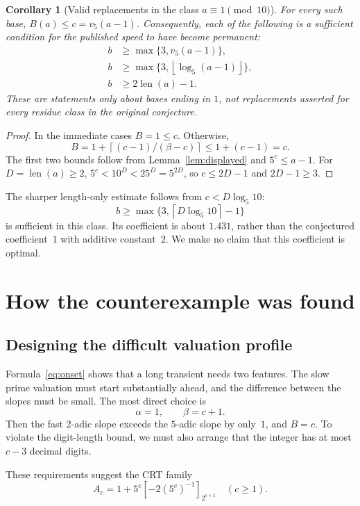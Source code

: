 \documentclass[11pt,a4paper]{article}
\newtheorem{corollary}[theorem]{Corollary}
\theoremstyle{definition}
\theoremstyle{remark}
\newcommand{\len}{\operatorname{len}}
\newcommand{\ceil}[1]{\left\lceil #1\right\rceil}
\newcommand{\floor}[1]{\left\lfloor #1\right\rfloor}
\newcommand{\res}[2]{\left[#1\right]_{#2}}
\begin{document}
\begin{corollary}[Valid replacements in the class $a\equiv1\pmod{10}$]\label{cor:replacement}
For every such base, $B(a)\le c=v_5(a-1)$. Consequently, each of the following is a sufficient condition for the published speed to have become permanent:
\begin{align}
 b&\ge\max\{3,v_5(a-1)\},\label{eq:valbound}\\
 b&\ge\max\{3,\floor{\log_5(a-1)}\},\label{eq:logbound}\\
 b&\ge2\len(a)-1.\label{eq:coarsebound}
\end{align}
These are statements only about bases ending in $1$, not replacements asserted for every residue class in the original conjecture.
\end{corollary}
\begin{proof}
In the immediate cases $B=1\le c$. Otherwise,
\[
 B=1+\ceil{(c-1)/(\beta-c)}\le1+(c-1)=c.
\]
The first two bounds follow from Lemma~\ref{lem:displayed} and $5^c\le a-1$.
For $D=\len(a)\ge2$, $5^c<10^D<25^D=5^{2D}$, so $c\le2D-1$ and $2D-1\ge3$.
\end{proof}

The sharper length-only estimate follows from $c<D\log_5 10$:
\[
 b\ge\max\{3,\ceil{D\log_5 10}-1\}
\]
is sufficient in this class. Its coefficient is about $1.431$, rather than the conjectured coefficient~$1$ with additive constant~$2$. We make no claim that this coefficient is optimal.

\section{How the counterexample was found}
\label{sec:search}

\subsection{Designing the difficult valuation profile}
Formula~\eqref{eq:onset} shows that a long transient needs two features. The slow prime valuation must start substantially ahead, and the difference between the slopes must be small. The most direct choice is
\[
 \alpha=1,\qquad\beta=c+1.
\]
Then the fast $2$-adic slope exceeds the $5$-adic slope by only~$1$, and $B=c$. To violate the digit-length bound, we must also arrange that the integer has at most $c-3$ decimal digits.

These requirements suggest the CRT family
\begin{equation}\label{eq:CRTfamily}
 A_c=1+5^c\res{-2(5^c)^{-1}}{2^{c+1}}\quad(c\ge1).
\end{equation}
\end{document}
